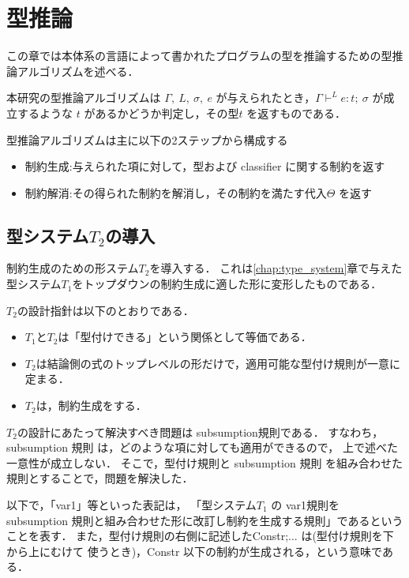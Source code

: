 \chapter{型推論}
\label{chap:type_inference}

この章では本体系の言語によって書かれたプログラムの型を推論するための型推論アルゴリズムを述べる．

本研究の型推論アルゴリズムは
$\Gamma,~ L,~ \sigma,~ e$ が与えられたとき，$\Gamma \vdash^{L} e : t ;~\sigma$ が成立するような $t$ があるかどうか判定し，その型$t$ を返すものである．

型推論アルゴリズムは主に以下の2ステップから構成する
\begin{itemize}
\item 制約生成:与えられた項に対して，型および classifier に関する制約を返す
\item 制約解消:その得られた制約を解消し，その制約を満たす代入$\Theta$ を返す
\end{itemize}

\section{型システム$T_2$の導入}
制約生成のための形ステム$T_2$を導入する．
これは\ref{chap:type_system}章で与えた型システム$T_1$をトップダウンの制約生成に適した形に変形したものである．

$T_2$の設計指針は以下のとおりである．
\begin{itemize}
\item $T_1$と$T_2$は「型付けできる」という関係として等価である．
\item $T_2$は結論側の式のトップレベルの形だけで，適用可能な型付け規則が一意に定まる．
\item $T_2$は，制約生成をする．
\end{itemize}

$T_2$の設計にあたって解決すべき問題は subsumption規則である．
すなわち，subsumption 規則 は，どのような項に対しても適用ができるので，
上で述べた一意性が成立しない．
そこで，型付け規則と subsumption 規則 を組み合わせた規則とすることで，問題を解決した．

以下で，「var1」等といった表記は，
「型システム$T_1$ の var1規則を subsumption 規則と組み合わせた形に改訂し制約を生成する規則」であるということを表す．
また，型付け規則の右側に記述したConstr;... は(型付け規則を下から上にむけて
使うとき)，Constr 以下の制約が生成される，という意味である．

